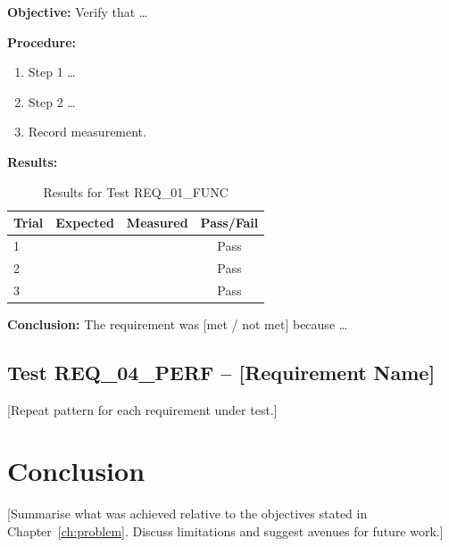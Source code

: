 \documentclass[12pt, a4paper]{report}
\begin{document}
\textbf{Objective:} Verify that \ldots

\textbf{Procedure:}
\begin{enumerate}
    \item Step 1 \ldots
    \item Step 2 \ldots
    \item Record measurement.
\end{enumerate}

\textbf{Results:}

\begin{table}[H]
    \centering
    \caption{Results for Test REQ\_01\_FUNC}
    \label{tab:test-req01}
    \begin{tabular}{@{} l c c c @{}}
        \toprule
        \textbf{Trial} & \textbf{Expected} & \textbf{Measured} & \textbf{Pass/Fail} \\
        \midrule
        1 & & & Pass \\
        2 & & & Pass \\
        3 & & & Pass \\
        \bottomrule
    \end{tabular}
\end{table}

\textbf{Conclusion:} The requirement was [met / not met] because \ldots

\section{Test REQ\_04\_PERF – [Requirement Name]}
\label{sec:test-req04}

[Repeat pattern for each requirement under test.]

\chapter{Conclusion}
\label{ch:conclusion}

[Summarise what was achieved relative to the objectives stated in
Chapter~\ref{ch:problem}. Discuss limitations and suggest avenues
for future work.]
\end{document}
